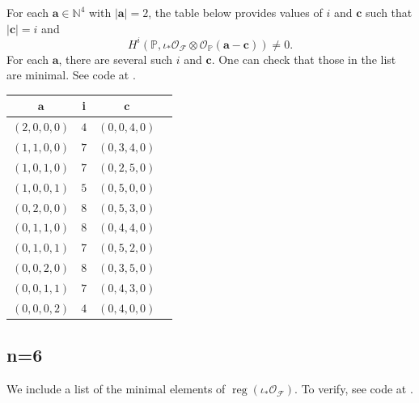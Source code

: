\documentclass[12pt,reqno]{amsart}
\theoremstyle{definition}
\theoremstyle{remark}
\newcommand{\reg}{\operatorname{reg}}
\newcommand{\calF}{{\mathcal{F}}}
\newcommand{\calO}{{\mathcal{O}}}
\begin{document}
For each $\mathbf a \in \mathbb N^4$ with $|\mathbf a| = 2$, the table below provides values of $i$ and $\mathbf c$ such that $|\mathbf c| = i$ and 
\[
H^i(\mathbb P, \iota_*\calO_{\calF}\otimes \calO_{\mathbb P}(\mathbf a-\mathbf c)) \neq 0.
\]
For each $\mathbf a$, there are several such $i$ and $\mathbf c$.  One can check that those in the list are minimal.  See code at \cite{githubRepo}.

\begin{center}
\begin{tabular}{ |c|c|c|c| } 
 \hline
$\mathbf a$ & i  & $\mathbf c$ \\
  \hline
  $(2,0,0,0)$ & $4$ & $(0,0,4,0)$\\ 
  \hline
$(1,1,0,0)$ & $7$ & $(0,3,4,0)$\\ 
  \hline
$(1,0,1,0)$ & $7$ & $(0,2,5,0)$\\ 
  \hline
$(1,0,0,1)$ & $5$ & $(0,5,0,0)$\\ 
  \hline
$(0,2,0,0)$ & $8$ & $(0,5,3,0)$\\ 
  \hline
$(0,1,1,0)$ & $8$ & $(0,4,4,0)$\\ 
  \hline
$(0,1,0,1)$ & $7$ & $(0,5,2,0)$\\ 
  \hline
$(0,0,2,0)$ & $8$ & $(0,3,5,0)$\\ 
  \hline
$(0,0,1,1)$ & $7$ & $(0,4,3,0)$\\ 
  \hline
  $(0,0,0,2)$ & $4$ & $(0,4,0,0)$\\ 
  \hline
\end{tabular}
\end{center}

\newpage

\subsection{n=6}\label{app:n=6}

We include a list of the minimal elements of $\reg(\iota_*\calO_{\calF})$.  To verify, see code at  \cite{githubRepo}.
\end{document}
